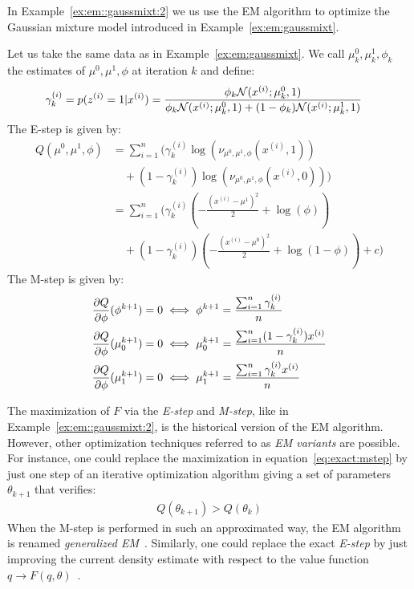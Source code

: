 In Example~\ref{ex:em::gaussmixt:2} we us use the EM algorithm to optimize the Gaussian mixture model introduced in Example~\ref{ex:em:gaussmixt}.
\begin{example}
  \label{ex:em::gaussmixt:2}
  Let us take the same data as in Example~\ref{ex:em:gaussmixt}. We call
  $\mu^0_k, \mu^1_k, \phi_k$ the estimates of $\mu^0, \mu^1, \phi$ at
  iteration $k$ and define:
  \begin{align}
    \gamma^{(i)}_k = p(z^{(i)} = 1 | x^{(i)}) &= \frac{\phi_k \mathcal{N}(x^{(i)}; \mu^0_k, 1)}{ \phi_k \mathcal{N}(x^{(i)}; \mu^0_k, 1) + (1 - \phi_k) \mathcal{N}(x^{(i)}; \mu^1_k, 1)} 
  \end{align}
  The E-step is given by:
  \begin{align}
    Q(\mu^0, \mu^1, \phi) &= \sum_{i=1}^n \Big( \gamma^{(i)}_k \log(\nu_{\mu^0, \mu^1, \phi}(x^{(i)}, 1)) \\ &\enspace \enspace + (1 - \gamma^{(i)}_k) \log(\nu_{\mu^0, \mu^1, \phi}(x^{(i)}, 0)) \Big) \\
              &= \sum_{i=1}^n \Big( \gamma^{(i)}_k( -\frac{(x^{(i)} - \mu^1)^2}{2} + \log(\phi)) \\ &\enspace \enspace + (1 - \gamma^{(i)}_k) ( -\frac{(x^{(i)} - \mu^0)^2}{2} + \log(1 -\phi)) + c \Big)
 \end{align}
 The M-step is given by:
 \begin{align}
   &\frac{ \partial Q}{\partial \phi}(\phi^{k + 1}) = 0 \iff \phi^{k + 1} = \frac{\sum_{i=1}^n \gamma^{(i)}_k}{n} \\
   &\frac{ \partial Q}{\partial \phi}(\mu^{k+1}_0) = 0 \iff \mu^{k + 1}_0 = \frac{\sum_{i=1}^n (1 - \gamma^{(i)}_k) x^{(i)}}{n} \\
   &\frac{ \partial Q}{\partial \phi}(\mu^{k+1}_1) = 0 \iff \mu^{k + 1}_1 = \frac{\sum_{i=1}^n \gamma^{(i)}_k x^{(i)}}{n}
 \end{align}
\end{example}


The maximization of $F$  via the \emph{E-step} and \emph{M-step}, like in
Example~\ref{ex:em::gaussmixt:2}, is the
historical version of the EM algorithm. However, other optimization techniques
referred to as \emph{EM variants}
are possible. For instance, one could replace the maximization in
equation~\eqref{eq:exact:mstep} by just one step of an iterative optimization
algorithm giving a set of parameters $\theta_{k+1}$ that verifies:
\begin{align}
  Q(\theta_{k+1}) > Q(\theta_k) 
\end{align}
When the M-step is performed in such an approximated way, the EM algorithm
is renamed \emph{generalized EM}~\cite{dempster1977maximum}.
Similarly, one could replace the exact \emph{E-step} by just improving the
current density estimate with respect to the value function $q \rightarrow F(q,
\theta)$~\cite{harmeling2010multiframe}.


